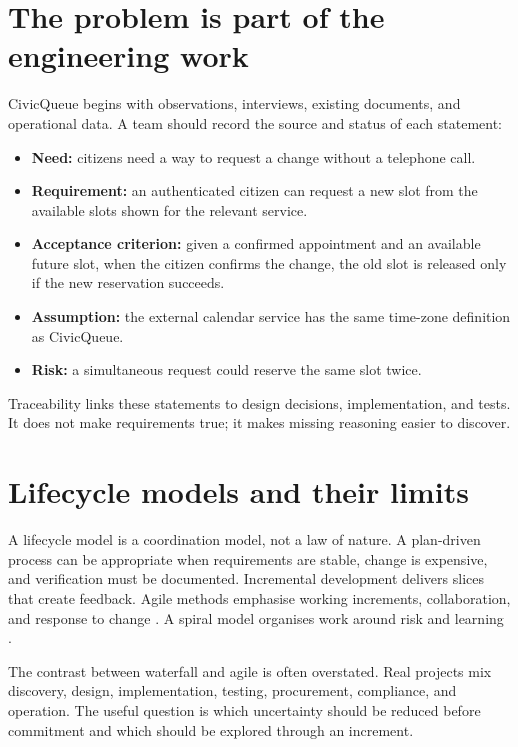 \section{The problem is part of the engineering work}
CivicQueue begins with observations, interviews, existing documents, and operational data. A team should record the source and status of each statement:
\begin{itemize}
\item \textbf{Need:} citizens need a way to request a change without a telephone call.
\item \textbf{Requirement:} an authenticated citizen can request a new slot from the available slots shown for the relevant service.
\item \textbf{Acceptance criterion:} given a confirmed appointment and an available future slot, when the citizen confirms the change, the old slot is released only if the new reservation succeeds.
\item \textbf{Assumption:} the external calendar service has the same time-zone definition as CivicQueue.
\item \textbf{Risk:} a simultaneous request could reserve the same slot twice.
\end{itemize}
Traceability links these statements to design decisions, implementation, and tests. It does not make requirements true; it makes missing reasoning easier to discover.

\section{Lifecycle models and their limits}
A lifecycle model is a coordination model, not a law of nature. A plan-driven process can be appropriate when requirements are stable, change is expensive, and verification must be documented. Incremental development delivers slices that create feedback. Agile methods emphasise working increments, collaboration, and response to change \citep{agilemanifesto2001}. A spiral model organises work around risk and learning \citep{boehm1988spiral}.

The contrast between waterfall and agile is often overstated. Real projects mix discovery, design, implementation, testing, procurement, compliance, and operation. The useful question is which uncertainty should be reduced before commitment and which should be explored through an increment.

